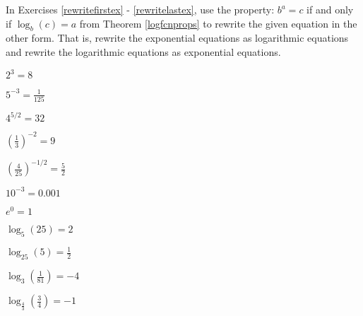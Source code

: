 \documentclass{ximera}
\begin{document}
	\author{Stitz-Zeager}


\begin{question}
In Exercises \ref{rewritefirstex} - \ref{rewritelastex}, use the property: $b^{a} = c$ if and only if $\log_{b}(c) = a$ from Theorem \ref{logfcnprops} to rewrite the given equation in the other form.  That is, rewrite the exponential equations as logarithmic equations and rewrite the logarithmic equations as exponential equations.

\begin{problem}\label{rewritefirstex}
$2^{3} = 8$
\end{problem}

\begin{problem}
$5^{-3} = \frac{1}{125}$
\end{problem}

\begin{problem}
$4^{5/2} = 32$ 
\end{problem}

\begin{problem}
$\left(\frac{1}{3}\right)^{-2} = 9$ 
\end{problem}

\begin{problem}
$\left(\frac{4}{25}\right)^{-1/2} = \frac{5}{2}$  
\end{problem}

\begin{problem}
$10^{-3} = 0.001$ 
\end{problem}

\begin{problem}
$e^{0}  = 1$ 
\end{problem}

\begin{problem}
$\log_{5}(25) = 2$
\end{problem}

\begin{problem}
$\log_{25} (5) = \frac{1}{2}$
\end{problem}

\begin{problem}
$\log_{3} \left(\frac{1}{81} \right) = -4$
\end{problem}

\begin{problem}
$\log_{\frac{4}{3}} \left(\frac{3}{4} \right) = -1$ 
\end{problem}


\end{question}
\end{document}
